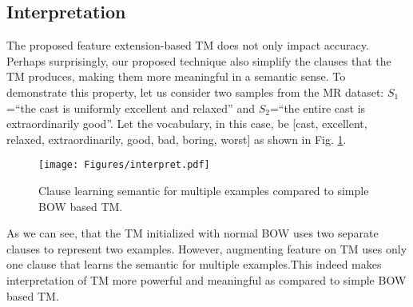 \documentclass[11pt]{article}
\begin{document}
\begin{table}[h]
\centering
{}
\caption{Comparison of feature extended TM with the state of the art for TREC. Reported accuracy of TM is the mean of last 50 epochs of 5 independent experiments with their standard deviation.}\label{table44}
\end{table}

\subsection{Interpretation}
The proposed feature extension-based TM does not only impact accuracy. Perhaps surprisingly, our proposed technique also simplify the clauses that the TM produces, making them more meaningful in a semantic sense. To demonstrate this property, let us consider two samples from the MR dataset:  $S_1$=``the cast is uniformly excellent and relaxed'' and $S_2$=``the entire cast is extraordinarily good''. Let the vocabulary, in this case, be [cast, excellent, relaxed, extraordinarily, good, bad, boring, worst] as shown in Fig. \ref{fig6}.


\begin{figure}[h]
    \centering
    \texttt{[image: Figures/interpret.pdf]}
    \caption{Clause learning semantic for multiple examples compared to simple BOW based TM.}
    \label{fig6}
\end{figure}
As we can see, that the TM initialized with normal BOW uses two separate clauses to represent two examples. However, augmenting feature on TM uses only one clause that learns the semantic for multiple examples.This indeed makes interpretation of TM more powerful and meaningful as compared to simple BOW based TM.
\end{document}
